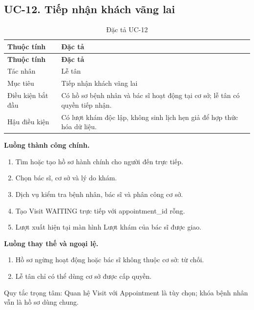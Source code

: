 \clearpage

\subsection{UC-12.\allowbreak{} Tiếp nhận khách vãng lai}
\label{uc:12}

{\small\setlength{\tabcolsep}{3pt}\renewcommand{\arraystretch}{1.12}
\begin{longtable}{@{}L{\textwidth-1.32pt\relax} L{\textwidth-4.68pt\relax}@{}}
\caption{Đặc tả UC-12}\\
\toprule
\textbf{Thuộc tính} & \textbf{Đặc tả}\\\midrule
\endfirsthead
\toprule
\textbf{Thuộc tính} & \textbf{Đặc tả}\\\midrule
\endhead
\bottomrule\endlastfoot
Tác nhân & Lễ tân\\[3pt]
Mục tiêu & Tiếp nhận khách vãng lai\\[3pt]
Điều kiện bắt đầu & Có hồ sơ bệnh nhân và bác sĩ hoạt động tại cơ sở; lễ tân có quyền tiếp nhận.\allowbreak{}\\[3pt]
Hậu điều kiện & Có lượt khám độc lập, không sinh lịch hẹn giả để hợp thức hóa dữ liệu.\allowbreak{}\\[3pt]
\end{longtable}}
\noindent\textbf{Luồng thành công chính.}
\begin{enumerate}
\item Tìm hoặc tạo hồ sơ hành chính cho người đến trực tiếp.\allowbreak{}
\item Chọn bác sĩ, cơ sở và lý do khám.\allowbreak{}
\item Dịch vụ kiểm tra bệnh nhân, bác sĩ và phân công cơ sở.\allowbreak{}
\item Tạo Visit WAITING trực tiếp với appointment\_\allowbreak{}id rỗng.\allowbreak{}
\item Lượt xuất hiện tại màn hình Lượt khám của bác sĩ được giao.\allowbreak{}
\end{enumerate}
\noindent\textbf{Luồng thay thế và ngoại lệ.}
\begin{enumerate}
\item Hồ sơ ngừng hoạt động hoặc bác sĩ không thuộc cơ sở:\allowbreak{} từ chối.\allowbreak{}
\item Lễ tân chỉ có thể dùng cơ sở được cấp quyền.\allowbreak{}
\end{enumerate}
Quy tắc trọng tâm:\allowbreak{} Quan hệ Visit với Appointment là tùy chọn; khóa bệnh nhân vẫn là hồ sơ dùng chung.\allowbreak{}

